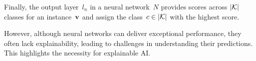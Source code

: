 %
Finally, the output layer~$l_n$ in a neural network~$N$ provides scores across 
$|{\mathcal{K}}|$ classes for an instance~$\mathbf{v}$ and assign the class~$c \in |{\mathcal{K}}|$
with the highest score.

However, although neural networks can deliver exceptional performance, they often lack 
explainability, leading to challenges in understanding their predictions.
%
This highlights the necessity for explainable AI.
